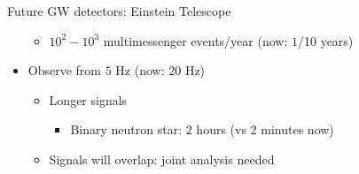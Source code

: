 \documentclass[usenames,dvipsnames,t]{beamer}
\begin{document}
\begin{frame}{Future GW detectors: Einstein Telescope}
\begin{itemize}
\begin{itemize}
      \item $10^{2} - 10^{3}$ multimessenger events/year (now: $1$/10 years)
    \end{itemize}

    \vspace{\y}

    \item<3-> Observe from $5$ Hz (now: $20$ Hz)
    \begin{itemize}
      
      \item Longer signals
      \begin{itemize}
        \item Binary neutron star: $2$ hours (vs 2 minutes now)
      \end{itemize}
      \item Signals will overlap: joint analysis needed
    \end{itemize}
  \end{itemize}

  \vspace{4mm}

\end{frame}
\end{document}
